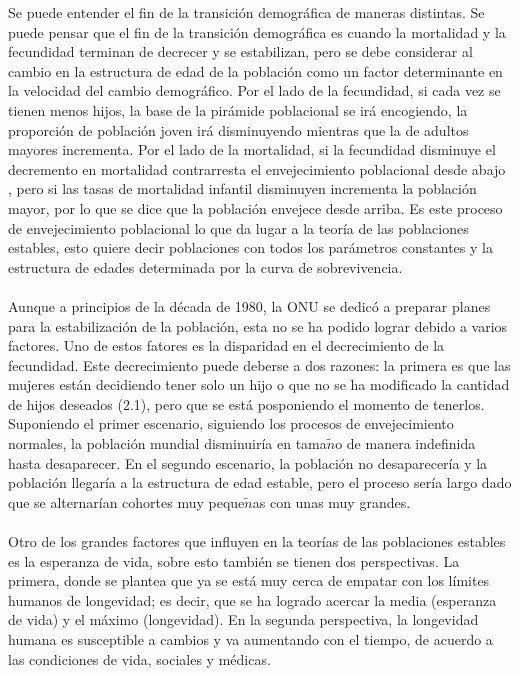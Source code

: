 \documentclass[10pt,spanish,letterpaper]{article}
\theoremstyle{plain}
\begin{document}
Se puede entender el fin de la transici\'on demogr\'afica de maneras distintas. Se puede pensar que el fin de la transici\'on demogr\'afica es cuando la mortalidad y la fecundidad terminan de decrecer y se estabilizan, pero se debe considerar al cambio en la estructura de edad de la poblaci\'on como un factor determinante en la velocidad del cambio demogr\'afico. Por el lado de la fecundidad, si cada vez se tienen menos hijos, la base de la pir\'amide poblacional se ir\'a encogiendo, la proporci\'on de poblaci\'on joven ir\'a disminuyendo mientras que la de adultos mayores incrementa. Por el lado de la mortalidad, si la fecundidad disminuye el decremento en mortalidad contrarresta el envejecimiento poblacional desde abajo , pero si las tasas de mortalidad infantil disminuyen incrementa la poblaci\'on mayor, por lo que se dice que la poblaci\'on envejece desde arriba. Es este proceso de envejecimiento poblacional lo que da lugar a la teor\'ia de las poblaciones estables, esto quiere decir poblaciones con todos los par\'ametros constantes y la estructura de edades determinada por la curva de sobrevivencia.\\%
\\
Aunque a principios de la d\'ecada de 1980, la ONU se dedic\'o a preparar planes para la estabilizaci\'on de la poblaci\'on, esta no se ha podido lograr debido a varios factores. Uno de estos fatores es la disparidad en el decrecimiento de la fecundidad. Este decrecimiento puede deberse a dos razones: la primera es que las mujeres est\'an decidiendo tener solo un hijo o que no se ha modificado la cantidad de hijos deseados (2.1), pero que se est\'a posponiendo el momento de tenerlos. Suponiendo el primer escenario, siguiendo los procesos de envejecimiento normales, la poblaci\'on mundial disminuir\'ia en tama$\tilde{n}$o de manera indefinida hasta desaparecer. En el segundo escenario, la poblaci\'on no desaparecer\'ia y la poblaci\'on llegar\'ia a la estructura de edad estable, pero el proceso ser\'ia largo dado que se alternar\'ian cohortes muy peque$\tilde{n}$as con unas muy grandes.\\
\\
Otro de los grandes factores que influyen en la teor\'ias de las poblaciones estables es la esperanza de vida, sobre esto tambi\'en se tienen dos perspectivas. La primera, donde se plantea que ya se est\'a muy cerca de empatar con los l\'imites humanos de longevidad; es decir, que se ha logrado acercar la media (esperanza de vida) y el m\'aximo (longevidad). En la segunda perspectiva, la longevidad humana es susceptible a cambios y va aumentando con el tiempo, de acuerdo a las condiciones de vida, sociales y m\'edicas.\\
\end{document}
